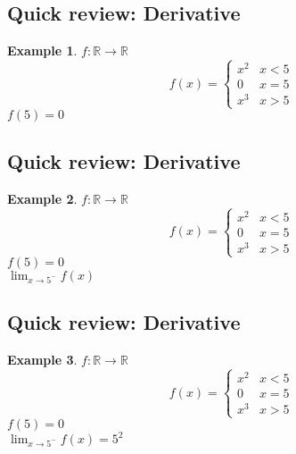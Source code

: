 \documentclass[twocolumn,20pt,fleqn]{extarticle}
\theoremstyle{plain}
\theoremstyle{definition}
\newtheorem*{example}{Example}
\theoremstyle{remark}
\begin{document}
\clearpage



\subsection{Quick review: Derivative}
\begin{example}
  $f : \mathbb{R}\to \mathbb{R}$
  \[f(x) =
      \begin{cases}
        x^2 & x < 5\\
        0 & x = 5\\
        x^3 & x > 5
      \end{cases}
      \]
      $f(5)=0$\\
\end{example}


\clearpage



\subsection{Quick review: Derivative}
\begin{example}
  $f : \mathbb{R}\to \mathbb{R}$
  \[f(x) =
      \begin{cases}
        x^2 & x < 5\\
        0 & x = 5\\
        x^3 & x > 5
      \end{cases}
      \]
      $f(5)=0$\\
$\displaystyle\lim_{x \to 5^-} f(x) $\end{example}


\clearpage



\subsection{Quick review: Derivative}
\begin{example}
  $f : \mathbb{R}\to \mathbb{R}$
  \[f(x) =
      \begin{cases}
        x^2 & x < 5\\
        0 & x = 5\\
        x^3 & x > 5
      \end{cases}
      \]
      $f(5)=0$\\
$\displaystyle\lim_{x \to 5^-} f(x)  = 5^2$\\
\end{example}


\clearpage
\end{document}
